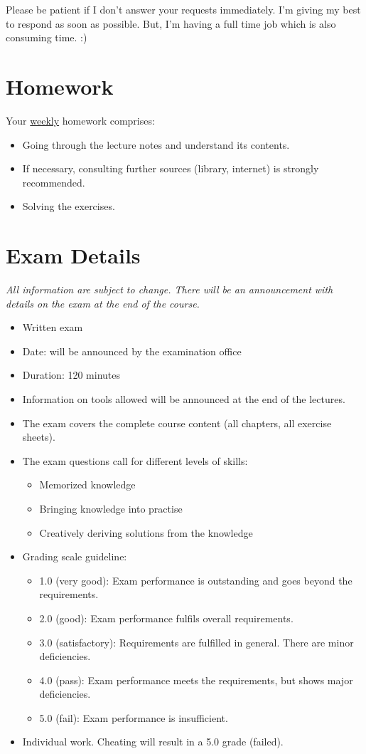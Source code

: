 Please be patient if I don't answer your requests immediately. I'm giving my best to respond as soon as possible. But, I'm having a full time job which is also consuming time. :)


\section{Homework}

Your \underline{weekly} homework comprises:
\begin{itemize}
	\item Going through the lecture notes and understand its contents.
	\item If necessary, consulting further sources (library, internet) is strongly recommended.
	\item Solving the exercises.
\end{itemize}


\section{Exam Details}

\textit{All information are subject to change. There will be an announcement with details on the exam at the end of the course.}

\begin{itemize}
	\item Written exam
	\item Date: will be announced by the examination office
	\item Duration: 120 minutes
	\item Information on tools allowed will be announced at the end of the lectures.
	\item The exam covers the complete course content (all chapters, all exercise sheets).
	\item The exam questions call for different levels of skills:
	\begin{itemize}
		\item Memorized knowledge
		\item Bringing knowledge into practise
		\item Creatively deriving solutions from the knowledge
	\end{itemize}
	\item Grading scale guideline:
	\begin{itemize}
		\item 1.0 (very good): Exam performance is outstanding and goes beyond the requirements.
		\item 2.0 (good): Exam performance fulfils overall requirements.
		\item 3.0 (satisfactory): Requirements are fulfilled in general. There are minor deficiencies.
		\item 4.0 (pass): Exam performance meets the requirements, but shows major deficiencies.
		\item 5.0 (fail): Exam performance is insufficient.
	\end{itemize}
	\item Individual work. Cheating will result in a 5.0 grade (failed).
\end{itemize}


